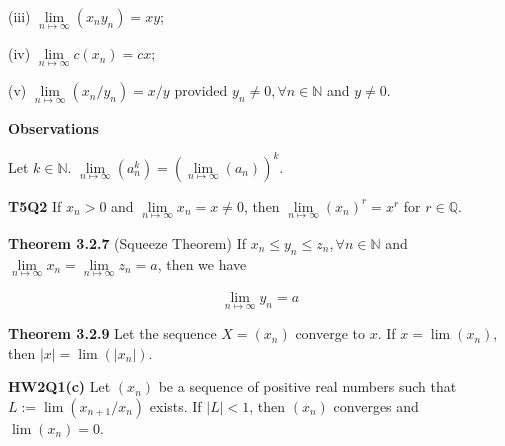 \documentclass[10pt,landscape]{article}
\begin{document}
\begin{multicols}{4}
(iii) $\underset{n \mapsto \infty}{\lim}(x_ny_n) = xy$;

(iv) $\underset{n \mapsto \infty}{\lim} c(x_n) = cx$;

(v) $\underset{n \mapsto \infty}{\lim} (x_n / y_n) = x / y$ provided $y_n \neq 0, \forall n \in \mathbb{N}$ and $y \neq 0$.

\textbf{Observations}

Let $k \in \mathbb{N}$. $\underset{n \mapsto \infty}{\lim} (a_n^k) = (\underset{n \mapsto \infty}{\lim} (a_n))^k$.

\textbf{T5Q2} If $x_n > 0$ and $\underset{n \mapsto \infty}{\lim} x_n = x \neq 0$, then $\underset{n \mapsto \infty}{\lim} (x_n)^r = x^r$ for $r \in \mathbb{Q}$.







\textbf{Theorem 3.2.7} (Squeeze Theorem) If $x_n \leq y_n \leq z_n, \forall n \in \mathbb{N}$ and $\underset{n \mapsto \infty}{\lim} x_n = \underset{n \mapsto \infty}{\lim} z_n = a$, then we have 

$$
\underset{n \mapsto \infty}{\lim} y_n = a
$$

\textbf{Theorem 3.2.9} Let the sequence $X = (x_n)$ converge to $x$. If $x = \lim (x_n)$, then $|x| = \lim (|x_n|)$.


\textbf{HW2Q1(c)} Let $(x_n)$ be a sequence of positive real numbers such that $L:= \lim (x_{n+1} / x_n)$ exists. If $|L| < 1$, then $(x_n)$ converges and $\lim(x_n) = 0$.


\end{multicols}
\end{document}
